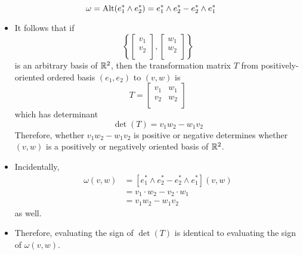 \documentclass[../notes.tex]{subfiles}
\begin{document}
\begin{itemize}
\begin{itemize}
        \begin{equation*}
            \omega = \operatorname{Alt}(e_1^*\wedge e_2^*) = e_1^*\wedge e_2^*-e_2^*\wedge e_1^*
        \end{equation*}
        \begin{itemize}
            \item It follows that if
            \begin{equation*}
                \left\{
                    \begin{bmatrix}
                        v_1\\
                        v_2\\
                    \end{bmatrix},
                    \begin{bmatrix}
                        w_1\\
                        w_2\\
                    \end{bmatrix}
                \right\}
            \end{equation*}
            is an arbitrary basis of $\mathbb{R}^2$, then the transformation matrix $T$ from positively-oriented ordered basis $(e_1,e_2)$ to $(v,w)$ is
            \begin{equation*}
                T =
                \begin{bmatrix}
                    v_1 & w_1\\
                    v_2 & w_2\\
                \end{bmatrix}
            \end{equation*}
            which has determinant
            \begin{equation*}
                \det(T) = v_1w_2-w_1v_2
            \end{equation*}
            Therefore, whether $v_1w_2-w_1v_2$ is positive or negative determines whether $(v,w)$ is a positively or negatively oriented basis of $\mathbb{R}^2$.
            \item Incidentally,
            \begin{align*}
                \omega(v,w) &= [e_1^*\wedge e_2^*-e_2^*\wedge e_1^*](v,w)\\
                &= v_1\cdot w_2-v_2\cdot w_1\\
                &= v_1w_2-w_1v_2
            \end{align*}
            as well.
            \item Therefore, evaluating the sign of $\det(T)$ is identical to evaluating the sign of $\omega(v,w)$.

\end{itemize}
\end{itemize}
\end{itemize}
\end{document}
